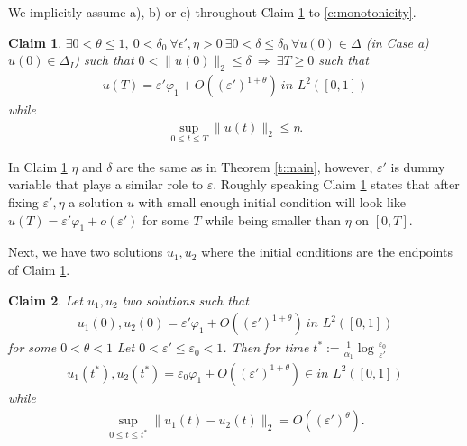 \documentclass{article}
\newcommand{\1}[1]{{\mathds{1}}_{\left\{#1\right\}}}
\newtheorem{claim}{Claim}
\begin{document}
We implicitly assume a), b) or c) throughout Claim \ref{c:epsilon'} to \ref{c:monotonicity}.


\begin{claim}
\label{c:epsilon'}
$\exists 0<\theta \leq 1, \ 0<\delta_0  \ \forall \epsilon',\eta>0 \ \exists 0<\delta \leq \delta_0 \ \forall u(0) \in \Delta$ (in Case a) $u(0) \in \Delta_I$) such that $0<\| u(0)\|_2 \leq \delta \ \Rightarrow \ \exists T \geq 0$ such that
\begin{align}
	\label{eq:epsilon'_1}
	u(T)=\varepsilon' \varphi_1+O \left((\varepsilon')^{1+\theta} \right) \ \textit{in } L^2([0,1])
\end{align}
while
\begin{align}
	\label{eq:epsilon'_2}
	\sup_{0 \leq t \leq T} \|u(t) \|_2 \leq \eta.
\end{align}  	
\end{claim}


In Claim \ref{c:epsilon'} $\eta$ and $\delta$ are the same as in Theorem \ref{t:main}, however, $\varepsilon'$ is dummy variable that plays a similar role to $\varepsilon$. Roughly speaking Claim \ref{c:epsilon'} states that after fixing $\varepsilon',\eta$ a solution $u$ with small enough initial condition will look like $u(T)=\varepsilon' \varphi_1+o(\varepsilon')$ for some $T$ while being smaller than $\eta$ on $[0,T]$. 

Next, we have two solutions $u_1,u_2$ where the initial conditions are the endpoints of Claim \ref{c:epsilon'}.

\begin{claim}
\label{c:epsilon_0}
Let $u_1,u_2$ two solutions such that
\begin{align}
\label{eq:epsilon_0_1}
u_1(0),u_2(0)=\varepsilon' \varphi_1+O \left((\varepsilon')^{1+\theta} \right) \ \textit{in } L^2([0,1])
\end{align}
for some $0<\theta<1$ Let $0<\varepsilon' \leq \varepsilon_0<1$. Then for time $t^*:=\frac{1}{\alpha_1} \log \frac{\varepsilon_0}{\varepsilon'}$
\begin{align}
\label{eq:epsilon_0_2}
u_1(t^*),u_2(t^*)=\varepsilon_0 \varphi_1+O \left((\varepsilon')^{1+\theta}\right) \in \textit{in } L^2([0,1])
\end{align}
while
\begin{align*}
	 \sup_{0 \leq t \leq t^*} \|u_1(t)-u_2(t) \|_2=O \left((\varepsilon')^\theta \right).
\end{align*}
\end{claim}
\end{document}
